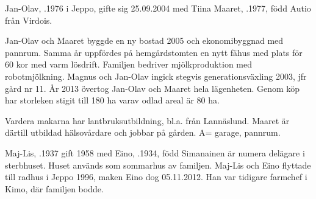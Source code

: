 %



%
Jan-Olav, .1976 i Jeppo, gifte sig 25.09.2004 med Tiina Maaret, .1977, född Autio från Virdois.
\begin{jhchildren}
  \item {}
  \item {}
  \item {}
  \item {}
  \item {}
\end{jhchildren}

Jan-Olav och Maaret byggde en ny bostad 2005 och ekonomibyggnad med pannrum. Samma år uppfördes på hemgårdstomten en nytt fähus med plats för 60 kor med varm lösdrift. Familjen bedriver mjölkproduktion med robotmjölkning. Magnus och Jan-Olav ingick stegvis generationsväxling 2003, jfr gård nr 11. År 2013 övertog Jan-Olav och Maaret hela lägenheten. Genom köp har storleken stigit till 180 ha varav odlad areal är 80 ha.

Vardera makarna har lantbruksutbildning, bl.a. från Lannäslund. Maaret är därtill utbildad hälsovårdare och jobbar på gården. A= garage, pannrum.



%



%
Maj-Lis, .1937 gift 1958 med Eino, .1934, född Simanainen är numera delägare i sterbhuset.  Huset används som sommarhus av familjen. Maj-Lis och Eino flyttade till radhus i Jeppo 1996, maken Eino dog 05.11.2012. Han var tidigare farmchef i Kimo, där familjen bodde.\jhvspace{}


